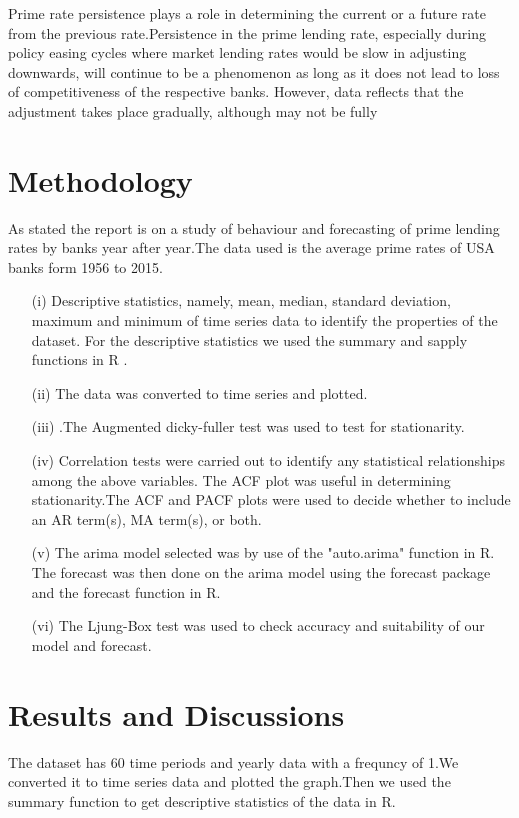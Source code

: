 \documentclass[12pt, a4paper]{report}\usepackage[]{graphicx}\usepackage[]{color}
\begin{document}
Prime rate persistence plays a role in determining the current or a future rate from the previous rate.Persistence in the prime lending rate, especially during policy easing cycles where market lending rates would be slow in adjusting downwards, will continue to be a phenomenon as long as it does not lead to loss of competitiveness of the respective banks. However, data reflects that the adjustment takes place gradually, although may not be fully \citep{perera2018analysis}



\section{Methodology}
As stated the report is on a study of behaviour and forecasting  of prime lending rates by banks year after year.The data used is the average prime rates of USA banks form 1956 to 2015.
\begin{enumerate}
\item [(i)] 
Descriptive statistics, namely, mean, median, standard deviation, maximum and minimum of time series data to identify the properties of the dataset.
For the descriptive statistics we used the summary and sapply functions in R .
\item [(ii)] The data was converted to time series and plotted.
\item [(iii)].The Augmented dicky-fuller test was used to test for stationarity.
\item [(iv)]Correlation tests were carried out to identify any statistical relationships among the above variables.
The ACF plot was useful in determining stationarity.The ACF and PACF plots were used to decide whether to include an AR term(s), MA term(s), or both. 
\item [(v)]The arima model selected was by use of the "auto.arima" function in R.
The forecast was then done on the arima model using the forecast package and the forecast function in R.
\item [(vi)]The Ljung-Box test was used to check accuracy and suitability of our model and forecast.
\end{enumerate}

\section{Results and Discussions}

The dataset has 60 time periods and yearly data with a frequncy of 1.We converted it to time series data and plotted the graph.Then we used the summary function to get descriptive statistics of the data in R.
\end{document}

